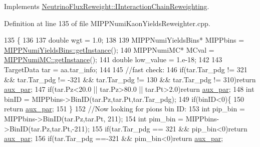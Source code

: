 Implements \hyperlink{class_neutrino_flux_reweight_1_1_i_interaction_chain_reweighting_ae28403553637013fdc720674ee24c7c5}{Neutrino\-Flux\-Reweight\-::\-I\-Interaction\-Chain\-Reweighting}.



Definition at line 135 of file M\-I\-P\-P\-Numi\-Kaon\-Yields\-Reweighter.\-cpp.


\begin{DoxyCode}
135                                                                                     \{
136     
137     \textcolor{keywordtype}{double} wgt = 1.0;
138 
139     MIPPNumiYieldsBins*  MIPPbins =  \hyperlink{class_neutrino_flux_reweight_1_1_m_i_p_p_numi_yields_bins_a7f44afe90a846812d6eabfafa8f576e4}{MIPPNumiYieldsBins::getInstance}();
140     MIPPNumiMC*  MCval =  \hyperlink{class_neutrino_flux_reweight_1_1_m_i_p_p_numi_m_c_a4324da8640cc9a0d157d82e08da3a1c3}{MIPPNumiMC::getInstance}();
141     \textcolor{keywordtype}{double} low\_value = 1.e-18;      
142     
143     TargetData tar = aa.tar\_info;
144 
145     \textcolor{comment}{//fast check:}
146     \textcolor{keywordflow}{if}(tar.Tar\_pdg != 321 && tar.Tar\_pdg != -321 && tar.Tar\_pdg != 130 && tar.Tar\_pdg != 310)\textcolor{keywordflow}{return} 
      \hyperlink{class_neutrino_flux_reweight_1_1_m_i_p_p_numi_kaon_yields_reweighter_a834bede67f164f8a08d50bd15f8ef02c}{aux\_par};
147     \textcolor{keywordflow}{if}(tar.Pz<20.0 || tar.Pz>80.0 || tar.Pt>2.0)\textcolor{keywordflow}{return} \hyperlink{class_neutrino_flux_reweight_1_1_m_i_p_p_numi_kaon_yields_reweighter_a834bede67f164f8a08d50bd15f8ef02c}{aux\_par};
148     \textcolor{keywordtype}{int} binID = MIPPbins->BinID(tar.Pz,tar.Pt,tar.Tar\_pdg);
149     \textcolor{keywordflow}{if}(binID<0)\{
150       \textcolor{keywordflow}{return} \hyperlink{class_neutrino_flux_reweight_1_1_m_i_p_p_numi_kaon_yields_reweighter_a834bede67f164f8a08d50bd15f8ef02c}{aux\_par};
151     \}
152     \textcolor{comment}{//Now looking for pions bin ID:}
153     \textcolor{keywordtype}{int} pip\_bin = MIPPbins->BinID(tar.Pz,tar.Pt, 211);
154     \textcolor{keywordtype}{int} pim\_bin = MIPPbins->BinID(tar.Pz,tar.Pt,-211);
155     \textcolor{keywordflow}{if}(tar.Tar\_pdg == 321 && pip\_bin<0)\textcolor{keywordflow}{return} \hyperlink{class_neutrino_flux_reweight_1_1_m_i_p_p_numi_kaon_yields_reweighter_a834bede67f164f8a08d50bd15f8ef02c}{aux\_par};
156     \textcolor{keywordflow}{if}(tar.Tar\_pdg ==-321 && pim\_bin<0)\textcolor{keywordflow}{return} \hyperlink{class_neutrino_flux_reweight_1_1_m_i_p_p_numi_kaon_yields_reweighter_a834bede67f164f8a08d50bd15f8ef02c}{aux\_par};

\end{DoxyCode}
